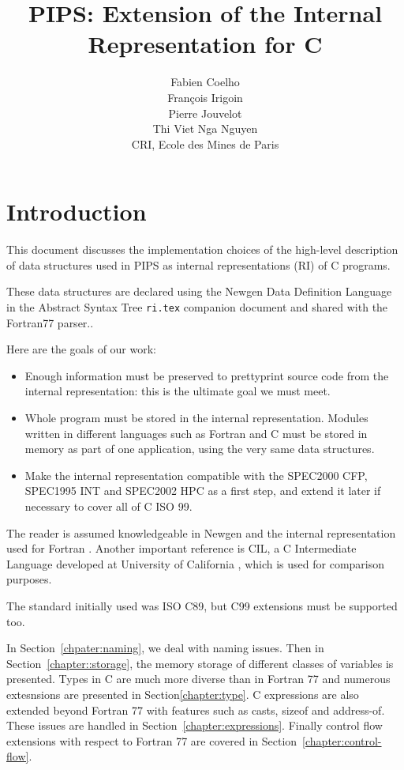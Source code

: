 \documentclass[a4paper]{report}
\title{PIPS: Extension of the Internal Representation for C}
\author{
  Fabien Coelho \\
  Fran\c{c}ois Irigoin \\
  Pierre Jouvelot \\
  Thi Viet Nga Nguyen \\
  CRI, Ecole des Mines de Paris}
\begin{document}
\noindent
\maketitle
\tableofcontents


\chapter*{Introduction}

This document discusses the implementation choices of the high-level
description of data structures used in PIPS as internal representations
(RI) of C programs.

These data structures are declared using the Newgen Data Definition
Language in the Abstract Syntax Tree \texttt{ri.tex} companion
document and shared with the Fortran77 parser..

Here are the goals of our work:
\begin{itemize}
\item Enough information must be preserved to prettyprint source code
  from the internal representation: this is the ultimate goal we must
  meet.
\item Whole program must be stored in the internal
  representation. Modules written in different languages such as
  Fortran and C must be stored in memory as part of one application,
  using the very same data structures.
\item Make the internal representation compatible with the SPEC2000
  CFP, SPEC1995 INT and SPEC2002 HPC as a first step, and extend it
  later if necessary to cover all of C ISO 99.
\end{itemize}
The reader is assumed knowledgeable in Newgen \cite{Jouv90} and the
internal representation used for Fortran \cite{Coel01}. Another
important reference is CIL, a C Intermediate Language developed at
University of California \cite{Necu02}, which is used for comparison
purposes.

The standard initially used was ISO C89, but C99 extensions must be
supported too.

In Section~\ref{chpater:naming}, we deal with naming issues. Then in
Section~\ref{chapter::storage}, the memory storage of different
classes of variables is presented. Types in C are much more diverse
than in Fortran 77 and numerous extesnsions are presented in
Section\ref{chapter:type}. C expressions are also extended beyond
Fortran 77 with features such as casts, sizeof and address-of. These
issues are handled in Section~\ref{chapter:expressions}. Finally
control flow extensions with respect to Fortran 77 are covered in
Section~\ref{chapter:control-flow}.
\end{document}
